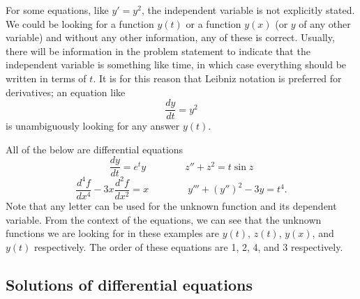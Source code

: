 For some equations, like $y' = y^2$, the independent variable is not explicitly stated. We could be looking for a function $y(t)$ or a function $y(x)$ (or $y$ of any other variable) and without any other information, any of these is correct. Usually, there will be information in the problem statement to indicate that the independent variable is something like time, in which case everything should be written in terms of $t$. It is for this reason that Leibniz notation is preferred for derivatives; an equation like
\[ \frac{dy}{dt} = y^2 \] is unambiguously looking for any answer $y(t)$.

\begin{example}
All of the below are differential equations
\begin{equation*}
\frac{dy}{dt} = e^t y \qquad \qquad z'' + z^2 = t\sin{z}
\end{equation*}
\begin{equation*}
\frac{d^4f}{dx^4} - 3x \frac{d^2f}{dx^2} = x \qquad \qquad y''' + (y'')^2 - 3y = t^4.
\end{equation*}
Note that any letter can be used for the unknown function and its dependent variable. From the context of the equations, we can see that the unknown functions we are looking for in these examples are $y(t)$, $z(t)$, $y(x)$, and $y(t)$ respectively. The order of these equations are 1, 2, 4, and 3 respectively. 
\end{example}


\subsection{Solutions of differential equations}

